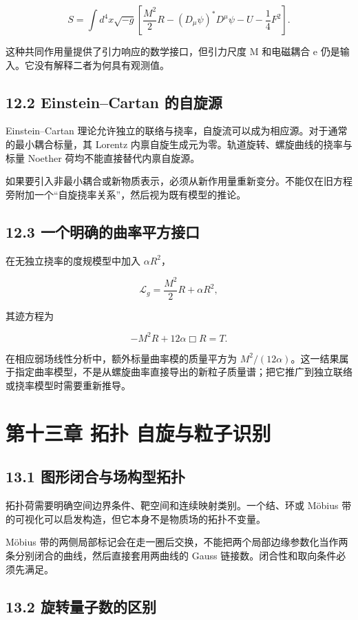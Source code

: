 \documentclass[UTF8,fontset=fandol,11pt]{ctexart}
\begin{document}
\[
S=\int d^4x\sqrt{-g}\left[\frac{M^2}{2}R
-(D_\mu\psi)^*D^\mu\psi-U-\frac14F^2\right].
\tag{12.1}
\]

这种共同作用量提供了引力响应的数学接口，但引力尺度 M 和电磁耦合 e 仍是输入。它没有解释二者为何具有观测值。

\subsection*{12.2 Einstein–Cartan 的自旋源}

Einstein–Cartan 理论允许独立的联络与挠率，自旋流可以成为相应源。对于通常的最小耦合标量，其 Lorentz 内禀自旋生成元为零。轨道旋转、螺旋曲线的挠率与标量 Noether 荷均不能直接替代内禀自旋源。

如果要引入非最小耦合或新物质表示，必须从新作用量重新变分。不能仅在旧方程旁附加一个“自旋挠率关系”，然后视为既有模型的推论。

\subsection*{12.3 一个明确的曲率平方接口}

在无独立挠率的度规模型中加入 \(\alpha R^2\)，

\[
\mathcal L_g=\frac{M^2}{2}R+\alpha R^2,
\]

其迹方程为

\[
-M^2R+12\alpha\Box R=T.
\tag{12.2}
\]

在相应弱场线性分析中，额外标量曲率模的质量平方为 \(M^2/(12\alpha)\)。这一结果属于指定曲率模型，不是从螺旋曲率直接导出的新粒子质量谱；把它推广到独立联络或挠率模型时需要重新推导。

\section*{第十三章 拓扑 自旋与粒子识别}

\subsection*{13.1 图形闭合与场构型拓扑}

拓扑荷需要明确空间边界条件、靶空间和连续映射类别。一个结、环或 Möbius 带的可视化可以启发构造，但它本身不是物质场的拓扑不变量。

Möbius 带的两侧局部标记会在走一圈后交换，不能把两个局部边缘参数化当作两条分别闭合的曲线，然后直接套用两曲线的 Gauss 链接数。闭合性和取向条件必须先满足。

\subsection*{13.2 旋转量子数的区别}
\end{document}
